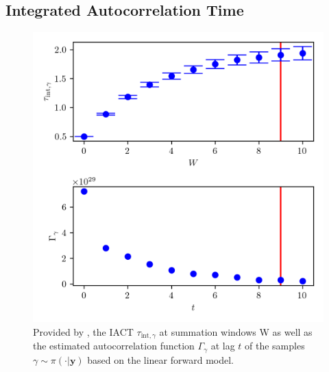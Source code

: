 \subsection{Integrated Autocorrelation Time} 
\begin{figure}[ht!]
	\centering
	\includegraphics{UwerrTauIntFirstO3gam.png}
	\caption[IACT and autocorrelation of samples $\gamma \sim \pi( \cdot | \bm{y})$, for linear model.]{Provided by \cite{drikHesse}, the IACT $\tau_{\text{int},\gamma}$ at summation windows W as well as the estimated autocorrelation function $\Gamma_{\gamma}$ at lag $t$ of the samples $\gamma \sim \pi(\cdot| \bm{y})$ based on the linear forward model.}
	\label{fig:IATCGamLin}
\end{figure}

